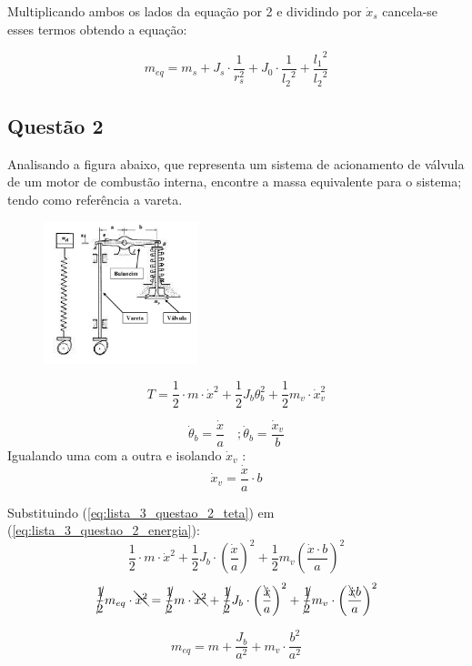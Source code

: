Multiplicando ambos os lados da equação por 2 e dividindo por $\dot{x}_s$
cancela-se esses termos obtendo a equação:

 \[
     m_{eq}= m_s + J_s\cdot \frac{1}{r_s^2}+ J_0\cdot \frac{1}{{l_2}^2} + \frac{{l_1}^{2}}{{l_2}^{2}}
\]


\subsection{Questão 2}
Analisando a figura abaixo, que representa um sistema de acionamento de válvula
de um motor de combustão interna, encontre a massa equivalente para o sistema;
tendo como referência a vareta.
\begin{figure}[ht]
    \centering
    \includegraphics[width=0.4\textwidth]{imagens/lista_3_questao_2.png}
    \label{fig:questao2}
\end{figure}
\resol

\begin{equation}\label{eq:lista_3_questao_2_energia}
    T = \frac{1}{2}\cdot m\cdot \dot{x}^2 + \frac{1}{2} J_b \theta_b^2 + \frac{1}{2} m_v\cdot \dot{x}_v^2
\end{equation}

\[
    \dot{\theta}_b = \frac{\dot x}{a}\quad ; \dot\theta_b= \frac{\dot x_v}{b}
\]
Igualando uma com a outra e isolando $\dot x_v$ :
\begin{equation}\label{eq:lista_3_questao_2_teta}
 \dot x_v=\frac{\dot x}{a}\cdot b
\end{equation}

Substituindo (\ref{eq:lista_3_questao_2_teta}) em
(\ref{eq:lista_3_questao_2_energia}):
\[
    \frac{1}{2}\cdot m \cdot \dot x^2 + \frac{1}{2}J_b\cdot \left( \frac{\dot x}{a} \right)^2 + \frac{1}{2}m_v \left(\frac{\dot x \cdot b}{a}  \right)^2
\]
\[
    \cancel{\frac{1}{2}}m_{eq}\cdot\bcancel{\dot x^2} = \cancel{\frac{1}{2}}m\cdot\bcancel{\dot x^2} + \cancel{\frac{1}{2}}J_b\cdot \left( \frac{\bcancel{\dot x}}{a} \right)^2 + \cancel{\frac{1}{2}}m_v \cdot \left( \frac{\bcancel{\dot x}b}{a} \right)^2
\]

\[
m_{eq}= m + \frac{J_b}{a^2} + m_v\cdot \frac{b^2}{a^2}
\]

